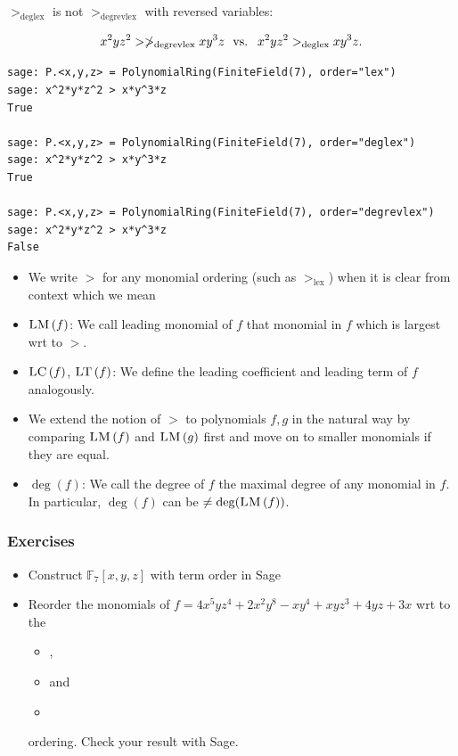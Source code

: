 \documentclass[9pt]{beamer}
\newcommand{\memph}[1]{{\color{yellow9}{\bf #1}}\xspace}
\newcommand{\F}[1][]{\ensuremath{\mathbb{F}_{#1}}\xspace}
\newcommand{\LM}[1]{\ensuremath{\textsc{LM}\left(#1\right)}\xspace}
\newcommand{\LC}[1]{\ensuremath{\textsc{LC}\left(#1\right)}\xspace}
\newcommand{\LT}[1]{\ensuremath{\textsc{LT}\left(#1\right)}\xspace}
\begin{document}
\begin{frame}
$>_{\textrm{deglex}}$ is not $>_{\textrm{degrevlex}}$ with reversed variables:

$$x^2yz^2 >\not>_{\textrm{degrevlex}} xy^3z\ \textnormal{ vs. }\ x^2yz^2 >_{\textrm{deglex}} xy^3z.$$

\framebreak

\begin{lstlisting}
sage: P.<x,y,z> = PolynomialRing(FiniteField(7), order="lex")
sage: x^2*y*z^2 > x*y^3*z
True

sage: P.<x,y,z> = PolynomialRing(FiniteField(7), order="deglex")
sage: x^2*y*z^2 > x*y^3*z
True

sage: P.<x,y,z> = PolynomialRing(FiniteField(7), order="degrevlex")
sage: x^2*y*z^2 > x*y^3*z                                 
False
\end{lstlisting}

\framebreak

\begin{itemize}
\item We write $>$ for any monomial ordering (such as $>_{\textrm{lex}}$) when it is clear from context which we mean
\item \LM{f}: We call leading monomial of $f$ that monomial in $f$ which is largest wrt to $>$.
\item \LC{f}, \LT{f}: We define the leading coefficient  and leading term  of $f$ analogously.
\item We extend the notion of $>$ to polynomials $f,g$ in the natural way by comparing $\LM{f}$ and $\LM{g}$ first and move on to smaller monomials if they are equal.
\item $\deg(f)$: We call the degree of $f$ the maximal degree of any monomial in $f$. In particular, $\deg(f)$ can be $\neq \deg(\LM{f})$.
\end{itemize}
\end{frame}

\begin{frame}
\frametitle{Exercises}
\begin{itemize}
\item Construct $\F[7][x,y,z]$ with term order \memph{deglex} in Sage
\item Reorder the monomials of $f = 4 x^{5} y z^{4} + 2 x^{2} y^{8} -  x y^{4} + x y z^{3} + 4 y z + 3 x$ wrt to the
\begin{itemize}
    \item \memph{lexicographical},
    \item \memph{degree lexicographical} and
    \item \memph{degree reverse lexicographical}
\end{itemize}
 ordering. Check your result with Sage.
\end{itemize}
\end{frame}
\end{document}
